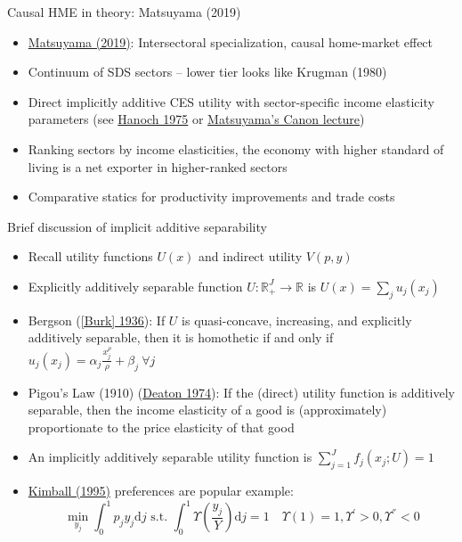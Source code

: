 \documentclass[11pt,notes=hide,aspectratio=169]{beamer}
\begin{document}
\begin{frame}{Causal HME in theory: Matsuyama (2019)}
\begin{itemize}
	\item \href{https://doi.org/10.3982/ECTA13765}{Matsuyama (2019)}: Intersectoral specialization, causal home-market effect
	\item Continuum of SDS sectors -- lower tier looks like Krugman (1980)
	\item Direct implicitly additive CES utility with sector-specific income elasticity parameters (see \href{https://ideas.repec.org/a/ecm/emetrp/v43y1975i3p395-419.html}{Hanoch 1975} or \href{http://faculty.wcas.northwestern.edu/~kmatsu/}{Matsuyama's Canon lecture})
	\item Ranking sectors by income elasticities, the economy with higher standard of living is a net exporter in higher-ranked sectors
	\item Comparative statics for productivity improvements and trade costs
\end{itemize}
\end{frame}
\begin{frame}{Brief discussion of implicit additive separability}
\begin{itemize}
	\item Recall utility functions $U(x)$ and indirect utility $V(p,y)$
	\item Explicitly additively separable function $U: \mathbb{R}_{+}^{J} \to \mathbb{R}$ is $U(x) = \sum_j u_j(x_j)$
	\item Bergson (\href{https://www.jstor.org/stable/2967658}{[Burk] 1936}): If $U$ is quasi-concave, increasing, and explicitly additively separable,
	then it is homothetic if and only if
	$u_j(x_j) = \alpha_j \frac{x_j^{\rho}}{\rho} + \beta_j \ \forall j$
	\item Pigou's Law (1910) (\href{https://www.jstor.org/stable/2231258}{Deaton 1974}): If the (direct) utility function is additively separable, then the income elasticity of a good is (approximately) proportionate to the price elasticity of that good
	\item An implicitly additively separable utility function is
	$\sum_{j=1}^{J} f_j\left(x_j; U\right)=1$
	\item \href{https://ideas.repec.org/a/mcb/jmoncb/v27y1995i4p1241-77.html}{Kimball (1995)} preferences are popular example:
	$$
	\min_{y_j} \int_{0}^{1} p_j y_j \textrm{d}j \text{ s.t. } \int_{0}^{1} \Upsilon \left(\frac{y_j}{Y}\right) \textrm{d}j = 1 
	\quad \Upsilon(1) = 1, \Upsilon^{'}>0, \Upsilon^{''}<0
	$$
\end{itemize}
\end{frame}
\end{document}
